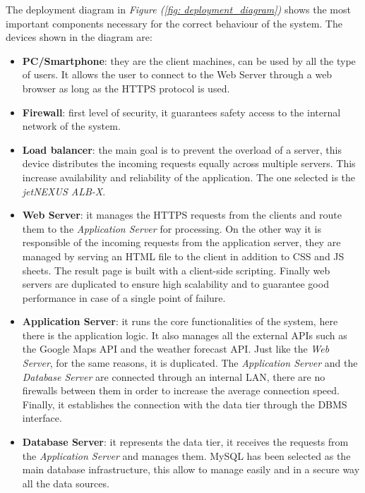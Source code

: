 \documentclass[table, 12pt]{article}
\begin{document}
The deployment diagram in \textit{Figure (\ref{fig: deployment_diagram})} shows the most important components necessary for the correct behaviour of the system.
The devices shown in the diagram are:
\begin{itemize}
    \item \textbf{PC/Smartphone}: they are the client machines, can be used by all the type of users.
    It allows the user to connect to the Web Server through a web browser as long as the HTTPS protocol is used.
    \item \textbf{Firewall}: first level of security, it guarantees safety access to the internal network of the system.
    \item \textbf{Load balancer}: the main goal is to prevent the overload of a server, this device distributes the incoming requests equally across multiple servers.
    This increase availability and reliability of the application.
    The one selected is the \textit{jetNEXUS ALB-X}.
    \item \textbf{Web Server}: it manages the HTTPS requests from the clients and route them to the \textit{Application Server} for processing.
    On the other way it is responsible of the incoming requests from the application server, they are managed by serving an HTML file to the client in addition to CSS and JS sheets.
    The result page is built with a client-side scripting.
    Finally web servers are duplicated to ensure high scalability and to guarantee good performance in case of a single point of failure.
    \item \textbf{Application Server}: it runs the core functionalities of the system, here there is the application logic.
    It also manages all the external APIs such as the Google Maps API and the weather forecast API.
    Just like the \textit{Web Server}, for the same reasons, it is duplicated.
    The \textit{Application Server} and the \textit{Database Server} are connected through an internal LAN, there are no firewalls between them in order to increase the average connection speed.
    Finally, it establishes the connection with the data tier through the DBMS interface.
    \item \textbf{Database Server}: it represents the data tier, it receives the requests from the \textit{Application Server} and manages them.
    MySQL has been selected as the main database infrastructure, this allow to manage easily and in a secure way all the data sources.
    
\end{itemize}
\newpage
\end{document}
